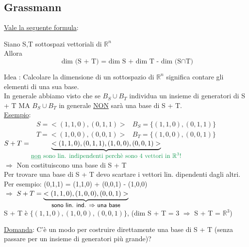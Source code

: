 \subsection{Grassmann}

\flushleft \textsf{\underline{Vale la seguente formula}:}\\
\begin{theorem}[Grassmann]
	Siano S,T sottospazi vettoriali di $\mathbb{R}^n$\\
	Allora\\
	\[
	\text{ dim  (S + T) = dim S + dim T - dim (S$\cap$T)}
	\]
\end{theorem}

\textsf{$\boxed{\text{Idea}}$ :} \textsf{\small Calcolare la dimensione di un sottospazio di $\mathbb{R}^n$ significa contare gli elementi di una sua base.}\\
\textsf{\small In generale abbiamo visto che se $B_S \cup B_T$ individua un insieme di generatori di S + T $\boxed{\text{MA}}$ $B_S \cup B_T$ in generale \underline{NON} sarà una base di S + T.}\\

\textsf{\underline{Esempio}:}
\begin{align*}
	S = <(1,1,0),(0,1,1)> & B_S = \{ (1,1,0),(0,1,1)\} \\
	T = <(1,0,0),(0,0,1)> & B_T = \{ (1,0,0),(0,0,1)\}
\end{align*}
$S + T = \underbrace{<(1,1,0),(0,1,1),(1,0,0),(0,0,1)>} _{\text{\textcolor{ForestGreen}{\small \underline{non} sono lin. indipendenti perchè sono 4 vettori in $\mathbb{R}^3$!}}}$\\
\color{ForestGreen}$\Rightarrow$ \textsf{\small Non costituiscono una base di S + T}\\
\textsf{\small Per trovare una base di S + T devo scartare i vettori lin. dipendenti dagli altri.}\\
\textsf{\small Per esempio: (0,1,1) = (1,1,0) + (0,0,1) - (1,0,0) }\\
\normalcolor $\Rightarrow$ $ S + T = \underbrace{<(1,1,0),(1,0,0),(0,0,1)>} _{\textsf{\small sono lin. ind. $\Rightarrow$ una base}}$\\

 \textsf{\small S + T è $\{ (1,1,0),(1,0,0),(0,0,1)\}$, (dim S + T = 3 $\Rightarrow$ S + T = $\mathbb{R}^3$)}\\
 
 \newpage
 
 \textsf{\underline{Domanda}:} \textsf{\small C'è un modo per costruire direttamente una base di S + T (senza passare per un insieme di generatori più grande)?}\\ 

